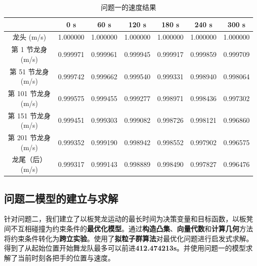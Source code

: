 \documentclass[a4paper]{article}
\begin{document}
		\begin{table}[H] %
		\captionsetup{skip=4pt} %
		\caption{问题一的速度结果}
		\centering
		\setlength{\arrayrulewidth}{0.5pt} %
		\begin{tabular}{|c|c|c|c|c|c|c|} %
			\hline
			& 0 s & 60 s & 120 s & 180 s & 240 s & 300 s \\ \hline
			龙头 (m/s)      &    1.000000 &	1.000000 &	1.000000 &	1.000000 &	1.000000 &	1.000000 \\ \hline
			第 1 节龙身 (m/s) &  0.999971 &	0.999961 &	0.999945 &	0.999917 &	0.999859 &	0.999709 \\ \hline
			第 51 节龙身 (m/s) & 0.999742 &	0.999662 &	0.999540 &	0.999331 &	0.998940 &	0.998064 \\ \hline
			第 101 节龙身 (m/s) &0.999575 &	0.999455 &	0.999277 &	0.998971 &	0.998436 &	0.997302 \\ \hline
			第 151 节龙身 (m/s) &0.999451 &	0.999303 &	0.999082 &	0.998726 &	0.998121 &	0.996860 \\ \hline
			第 201 节龙身 (m/s) &0.999352 &	0.999190 &	0.998942 &	0.998552 &	0.997902 &	0.996575 \\ \hline
			龙尾（后） (m/s) &   0.999317 &	0.999143 &	0.998889 &	0.998490 &	0.997827 &	0.996476 \\ \hline
		\end{tabular}
		\end{table}

	\subsection{问题二模型的建立与求解}
	     针对问题二，我们建立了以板凳龙运动的最长时间为决策变量和目标函数，以板凳间不互相碰撞为约束条件的\textbf{最优化模型}。通过\textbf{构造凸集}、\textbf{向量代数}和\textbf{计算几何}方法将约束条件转化为\textbf{跨立实验}。使用了\textbf{拟粒子群算法}对最优化问题进行启发式求解。得到了从起始位置开始舞龙队最多可以前进\textbf{412.474213s}。并使用问题一的模型求解了当前时刻各把手的位置与速度。
\end{document}
